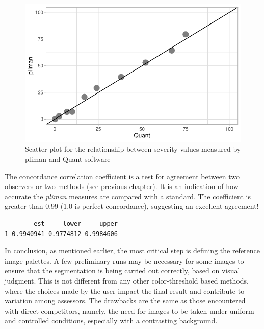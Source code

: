 \documentclass[
  letterpaper,
  DIV=11,
  numbers=noendperiod]{scrreprt}
\newenvironment{Shaded}{\begin{snugshade}}{\end{snugshade}}
\newcommand{\FunctionTok}[1]{\textcolor[rgb]{0.28,0.35,0.67}{#1}}
\newcommand{\NormalTok}[1]{\textcolor[rgb]{0.00,0.23,0.31}{#1}}
\newcommand{\OtherTok}[1]{\textcolor[rgb]{0.00,0.23,0.31}{#1}}
\newcommand{\SpecialCharTok}[1]{\textcolor[rgb]{0.37,0.37,0.37}{#1}}
\begin{document}
\begin{figure}[H]

{\centering \includegraphics{data-actual-severity_files/figure-pdf/fig-scatter-1.pdf}

}

\caption{\label{fig-scatter}Scatter plot for the relationship between
severity values measured by pliman and Quant software}

\end{figure}

The concordance correlation coefficient is a test for agreement between
two observers or two methods (see previous chapter). It is an indication
of how accurate the \emph{pliman} measures are compared with a standard.
The coefficient is greater than 0.99 (1.0 is perfect concordance),
suggesting an excellent agreement!

\begin{Shaded}
\end{Shaded}

\begin{verbatim}
        est     lower     upper
1 0.9940941 0.9774812 0.9984606
\end{verbatim}

In conclusion, as mentioned earlier, the most critical step is defining
the reference image palettes. A few preliminary runs may be necessary
for some images to ensure that the segmentation is being carried out
correctly, based on visual judgment. This is not different from any
other color-threshold based methods, where the choices made by the user
impact the final result and contribute to variation among assessors. The
drawbacks are the same as those encountered with direct competitors,
namely, the need for images to be taken under uniform and controlled
conditions, especially with a contrasting background.
\end{document}
